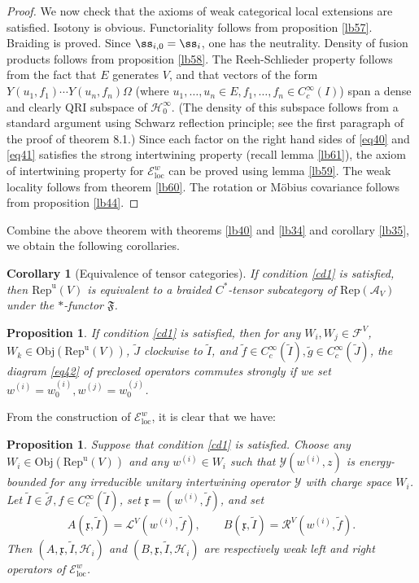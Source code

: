 \documentclass[12pt,a4paper]{article}
\theoremstyle{definition}
\theoremstyle{plain}
\newtheorem{pp}[df]{Proposition}
\newtheorem{co}[df]{Corollary}
\newcommand{\fk}{\mathfrak}
\newcommand{\mc}{\mathcal}
\newcommand{\wtd}{\widetilde}
\newcommand{\Rep}{\mathrm{Rep}}
\newcommand{\loc}{\mathrm{loc}}
\newcommand{\scr}{\mathscr}
\newcommand{\Jtd}{\widetilde{\mathcal J}}
\newcommand{\RepuV}{\mathrm{Rep}^{\mathrm u}(V)}
\newcommand{\Obj}{\mathrm{Obj}}
\numberwithin{equation}{subsection}
\begin{document}
\begin{proof}
We now check that the axioms of  weak categorical local extensions are satisfied. Isotony is obvious. Functoriality follows from proposition \ref{lb57}. Braiding is proved. Since $\ss_{i,0}=\ss_i$, one has the neutrality. Density of fusion products follows from proposition \ref{lb58}. The Reeh-Schlieder property follows from the fact that $E$ generates $V$, and that vectors of the form $Y(u_1,f_1)\cdots Y(u_n,f_n)\Omega$ (where $u_1,\dots,u_n\in E,f_1,\dots,f_n\in C_c^\infty(I)$) span a dense and clearly QRI subspace of $\mc H_0^\infty$. (The density of this subspace follows from a standard argument using Schwarz reflection principle; see the first paragraph of the proof of \cite{CKLW18} theorem 8.1.) Since each factor on the right hand sides of \eqref{eq40} and \eqref{eq41} satisfies the strong intertwining property (recall lemma \ref{lb61}), the axiom of intertwining property for $\scr E^w_\loc$ can be proved using lemma \ref{lb59}. The weak locality follows from theorem \ref{lb60}. The rotation or M\"obius covariance follows from proposition \ref{lb44}.
\end{proof}


Combine the above theorem with theorems \ref{lb40} and \ref{lb34} and corollary \ref{lb35}, we obtain the following corollaries.

\begin{co}[Equivalence of tensor categories]\label{lb71}
If condition \ref{cd1} is satisfied, then $\RepuV$ is equivalent to a braided $C^*$-tensor subcategory of $\Rep(\mc A_V)$ under the $*$-functor $\fk F$.
\end{co}

\begin{pp}\label{lb78}
If condition \ref{cd1} is satisfied, then for any $W_i,W_j\in\mc F^V$, $W_k\in\Obj(\RepuV)$, $\wtd J$ clockwise to $\wtd I$, and $\wtd f\in C_c^\infty(\wtd I),\wtd g\in C_c^\infty(\wtd J)$, the diagram \eqref{eq42} of preclosed operators commutes strongly if we set $w^{(i)}=w^{(i)}_0,w^{(j)}=w^{(j)}_0$.
\end{pp}

From the construction of $\scr E^w_\loc$, it is clear that we have:

\begin{pp}\label{lb64}
Suppose that condition \ref{cd1} is satisfied. Choose any $W_i\in\Obj(\RepuV)$ and any $w^{(i)}\in W_i$ such that $\mc Y(w^{(i)},z)$ is energy-bounded for any irreducible unitary intertwining operator $\mc Y$ with charge space $W_i$. Let $\wtd I\in\Jtd,f\in C_c^\infty(\wtd I)$,  set $\fk x=(w^{(i)},\wtd f)$, and set
\begin{align}
A(\fk x,\wtd I)=\mc L^V(w^{(i)},\wtd f),\qquad B(\fk x,\wtd I)=\mc R^V(w^{(i)},\wtd f).
\end{align}
Then $(A,\fk x,\wtd I,\mc H_i)$ and $(B,\fk x,\wtd I,\mc H_i)$ are respectively weak left and right operators of $\scr E^w_\loc$.
\end{pp}
\end{document}
